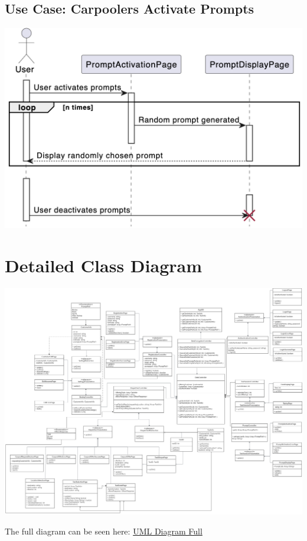 \documentclass[]{article}
\begin{document}
\subsection*{Use Case: Carpoolers Activate Prompts}
\includegraphics[scale=0.45]{Sequence Diagrams/GS7.png}

\section{Detailed Class Diagram}
\label{sec:detailed_class_diagram}
\includegraphics[scale=0.2]{images/UML-ClassDiagram.png}

The full diagram can be seen here: \href{https://cdn.discordapp.com/attachments/1065661481171038298/1087213470207967252/3A04-UML-Diagram.drawio.png}{UML Diagram Full}
\end{document}

